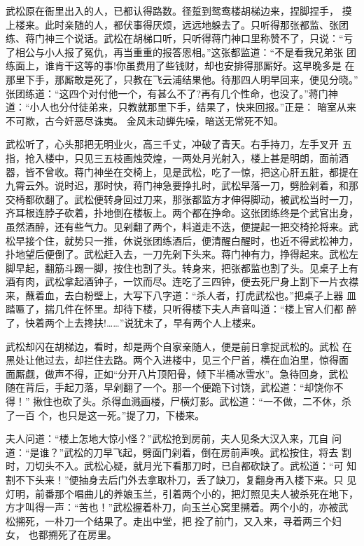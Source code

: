 武松原在衙里出入的人，已都认得路数。径踅到鸳鸯楼胡梯边来，捏脚捏手，
摸上楼来。此时亲随的人，都伏事得厌烦，远远地躲去了。只听得那张都监、张团
练、蒋门神三个说话。武松在胡梯口听，只听得蒋门神口里称赞不了，只说：“亏
了相公与小人报了冤仇，再当重重的报答恩相。”这张都监道：“不是看我兄弟张
团练面上，谁肯干这等的事!你虽费用了些钱财，却也安排得那厮好。这早晚多是
在那里下手，那厮敢是死了，只教在飞云浦结果他。待那四人明早回来，便见分晓。”
张团练道：“这四个对付他一个，有甚么不了?再有几个性命，也没了。”蒋门神
道：“小人也分付徒弟来，只教就那里下手，结果了，快来回报。”正是：
暗室从来不可欺，古今奸恶尽诛夷。
金风未动蝉先噪，暗送无常死不知。

武松听了，心头那把无明业火，高三千丈，冲破了青天。右手持刀，左手叉开
五指，抢入楼中，只见三五枝画烛荧煌，一两处月光射入，楼上甚是明朗，面前酒
器，皆不曾收。蒋门神坐在交椅上，见是武松，吃了一惊，把这心肝五脏，都提在
九霄云外。说时迟，那时快，蒋门神急要挣扎时，武松早落一刀，劈脸剁着，和那
交椅都砍翻了。武松便转身回过刀来，那张都监方才伸得脚动，被武松当时一刀，
齐耳根连脖子砍着，扑地倒在楼板上。两个都在挣命。这张团练终是个武官出身，
虽然酒醉，还有些气力。见剁翻了两个，料道走不迭，便提起一把交椅抡将来。武
松早接个住，就势只一推，休说张团练酒后，便清醒白醒时，也近不得武松神力，
扑地望后便倒了。武松赶入去，一刀先剁下头来。蒋门神有力，挣得起来。武松左
脚早起，翻筋斗踢一脚，按住也割了头。转身来，把张都监也割了头。见桌子上有
酒有肉，武松拿起酒钟子，一饮而尽。连吃了三四钟，便去死尸身上割下一片衣襟
来，蘸着血，去白粉壁上，大写下八字道：“杀人者，打虎武松也。”把桌子上器
皿踏匾了，揣几件在怀里。却待下楼，只听得楼下夫人声音叫道：“楼上官人们都
醉了，快着两个上去搀扶!……”说犹未了，早有两个人上楼来。

武松却闪在胡梯边，看时，却是两个自家亲随人，便是前日拿捉武松的。武松
在黑处让他过去，却拦住去路。两个入进楼中，见三个尸首，横在血泊里，惊得面
面厮觑，做声不得，正如“分开八片顶阳骨，倾下半桶冰雪水”。急待回身，武松
随在背后，手起刀落，早剁翻了一个。那一个便跪下讨饶，武松道：“却饶你不得！”
揪住也砍了头。杀得血溅画楼，尸横灯影。武松道：“一不做，二不休，杀了一百
个，也只是这一死。”提了刀，下楼来。

夫人问道：“楼上怎地大惊小怪？”武松抢到房前，夫人见条大汉入来，兀自
问道：“是谁？”武松的刀早飞起，劈面门剁着，倒在房前声唤。武松按住，将去
割时，刀切头不入。武松心疑，就月光下看那刀时，已自都砍缺了。武松道：“可
知割不下头来！”便抽身去后门外去拿取朴刀，丢了缺刀，复翻身再入楼下来。只
见灯明，前番那个唱曲儿的养娘玉兰，引着两个小的，把灯照见夫人被杀死在地下，
方才叫得一声：“苦也！”武松握着朴刀，向玉兰心窝里搠着。两个小的，亦被武
松搠死，一朴刀一个结果了。走出中堂，把拴了前门，又入来，寻着两三个妇女，
也都搠死了在房里。

